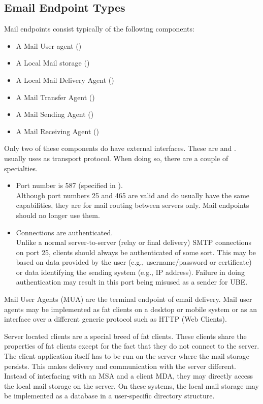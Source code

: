\subsection{Email Endpoint Types}

Mail endpoints consist typically of the following components:
\begin{itemize}
	\item A Mail User agent ()
	\item A Local Mail storage ()
	\item A Local Mail Delivery Agent ()
	\item A Mail Transfer Agent ()
	\item A Mail Sending Agent ()
	\item A Mail Receiving Agent ()
\end{itemize}

Only two of these components do have external interfaces. These are  and .  usually uses  as transport protocol. When doing so, there are a couple of specialties. 
\begin{itemize}
	\item Port number is 587 (specified in \cite{RFC4409}).\\
	Although port numbers 25 and 465 are valid and do usually have the same capabilities, they are for mail routing between servers only. Mail endpoints should no longer use them.
	\item Connections are authenticated.\\
	Unlike a normal server-to-server (relay or final delivery) SMTP connections on port 25, clients should always be authenticated of some sort. This may be based on data provided by the user (e.g., username/password or certificate) or data identifying the sending system (e.g., IP address)\cite{RFC4409}. Failure in doing authentication may result in this port being misused as a sender for UBE.
\end{itemize}

Mail User Agents (MUA) are the terminal endpoint of email delivery. Mail user agents may be implemented as fat clients on a desktop or mobile system or as an interface over a different generic protocol such as HTTP (Web Clients). 

Server located clients are a special breed of fat clients. These clients share the properties of fat clients except for the fact that they do not connect to the server. The client application itself has to be run on the server where the mail storage persists. This makes delivery and communication with the server different. Instead of interfacing with an MSA and a client MDA, they may directly access the local mail storage on the server. On these systems, the local mail storage may be implemented as a database in a user-specific directory structure.

